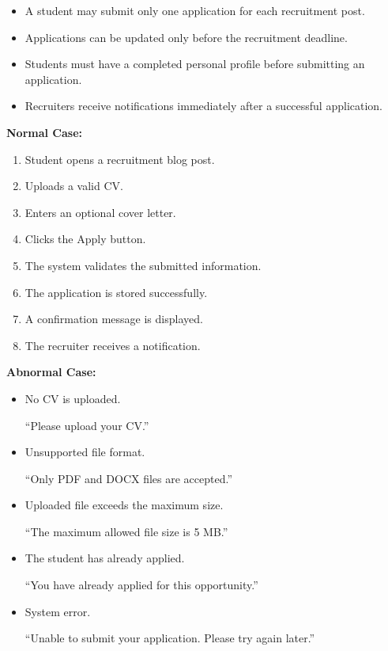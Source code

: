 \begin{itemize}
    \item A student may submit only one application for each recruitment post.
    \item Applications can be updated only before the recruitment deadline.
    \item Students must have a completed personal profile before submitting an application.
    \item Recruiters receive notifications immediately after a successful application.
\end{itemize}

\vspace{0.2cm}

\textbf{Normal Case:}

\begin{enumerate}
    \item Student opens a recruitment blog post.
    \item Uploads a valid CV.
    \item Enters an optional cover letter.
    \item Clicks the Apply button.
    \item The system validates the submitted information.
    \item The application is stored successfully.
    \item A confirmation message is displayed.
    \item The recruiter receives a notification.
\end{enumerate}

\vspace{0.2cm}

\textbf{Abnormal Case:}

\begin{itemize}
    \item No CV is uploaded.

    ``Please upload your CV.''

    \item Unsupported file format.

    ``Only PDF and DOCX files are accepted.''

    \item Uploaded file exceeds the maximum size.

    ``The maximum allowed file size is 5 MB.''

    \item The student has already applied.

    ``You have already applied for this opportunity.''

    \item System error.

    ``Unable to submit your application. Please try again later.''
\end{itemize}

